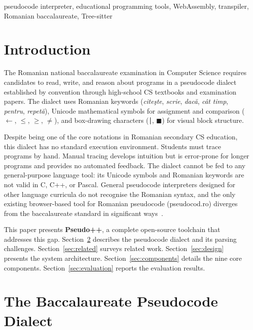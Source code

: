 \documentclass[conference]{IEEEtran}
\begin{document}
\begin{IEEEkeywords}
pseudocode interpreter, educational programming tools, WebAssembly,
transpiler, Romanian baccalaureate, Tree-sitter
\end{IEEEkeywords}

\section{Introduction}
\label{sec:intro}

The Romanian national baccalaureate examination in Computer Science requires
candidates to read, write, and reason about programs in a pseudocode dialect
established by convention through high-school CS textbooks and examination
papers.  The dialect uses Romanian keywords
(\textit{cite\c{s}te}, \textit{scrie}, \textit{dac\u{a}}, \textit{c\^{a}t
timp}, \textit{pentru}, \textit{repet\u{a}}), Unicode mathematical symbols
for assignment and comparison ($\leftarrow$, $\leq$, $\geq$, $\neq$), and
box-drawing characters (\texttt{│}, $\blacksquare$) for
visual block structure.

Despite being one of the core notations in Romanian secondary CS education,
this dialect has no standard execution environment.  Students must trace
programs by hand.  Manual tracing develops intuition but is error-prone for
longer programs and provides no automated feedback.  The dialect cannot be fed
to any general-purpose language tool: its Unicode symbols and Romanian keywords
are not valid in C, C++, or Pascal.  General pseudocode interpreters designed
for other language curricula do not recognise the Romanian syntax, and the only
existing browser-based tool for Romanian pseudocode (pseudocod.ro) diverges
from the baccalaureate standard in significant ways~\cite{pseudocodro}.

This paper presents \textbf{Pseudo++}, a complete open-source toolchain that
addresses this gap.  Section~\ref{sec:dialect} describes the pseudocode dialect
and its parsing challenges.  Section~\ref{sec:related} surveys related work.
Section~\ref{sec:design} presents the system architecture.
Section~\ref{sec:components} details the nine core components.
Section~\ref{sec:evaluation} reports the evaluation results.

\section{The Baccalaureate Pseudocode Dialect}
\label{sec:dialect}
\end{document}
